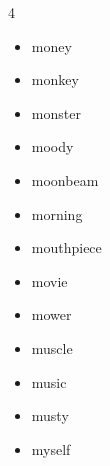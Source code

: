 \documentclass{article}
\begin{document}
\begin{multicols}{4}
\begin{itemize}
        \item money
        \item monkey
        \item monster
        \item moody
        \item moonbeam
        \item morning
        \item mouthpiece
        \item movie
        \item mower
        \item muscle
        \item music
        \item musty
        \item myself
    \end{itemize}
\end{multicols}

\pagebreak
\end{document}
